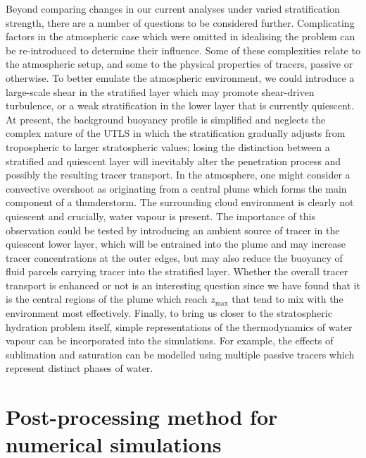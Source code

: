\documentclass[a4paper]{article}
\begin{document}
Beyond comparing changes in our current analyses under varied stratification strength, there are a number of
questions to be considered further. Complicating factors in the atmospheric case which were omitted in
idealising the problem can be re-introduced to determine their influence. Some of these complexities relate to
the atmospheric setup, and some to the physical properties of tracers, passive or otherwise. To better emulate
the atmospheric environment, we could introduce a large-scale shear in the stratified layer which may promote
shear-driven turbulence, or a weak stratification in the lower layer that is currently quiescent. At
present, the background buoyancy profile is simplified and neglects the complex nature of the UTLS in which
the stratification gradually adjusts from tropospheric to larger stratospheric values; losing the distinction
between a stratified and quiescent layer will inevitably alter the penetration process and possibly the
resulting tracer transport. In the atmosphere, one might consider a convective overshoot as originating from a
central plume which forms the main component of a thunderstorm. The surrounding cloud environment is clearly
not quiescent and crucially, water vapour is present. The importance of this observation could be tested by
introducing an ambient source of tracer in the quiescent lower layer, which will be entrained into the plume
and may increase tracer concentrations at the outer edges, but may also reduce the buoyancy of fluid parcels
carrying tracer into the stratified layer. Whether the overall tracer transport is enhanced or not is an
interesting question since we have found that it is the central regions of the plume which reach $z_{\max}$
that tend to mix with the environment most effectively. Finally, to bring us closer to the stratospheric
hydration problem itself, simple representations of the thermodynamics of water vapour can be incorporated
into the simulations. For example, the effects of sublimation and saturation can be modelled using multiple
passive tracers which represent distinct phases of water.


\appendix

\section{Post-processing method for numerical simulations}
\label{app:postprocessing}
\end{document}
